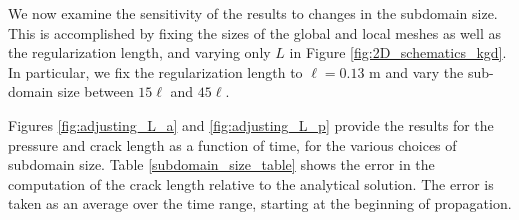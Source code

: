 We now examine the sensitivity of the results to changes in the subdomain size.  This is accomplished by fixing the sizes of the global and local meshes as well as the regularization length, and varying only $L$ in Figure \ref{fig:2D_schematics_kgd}. In particular, we fix the regularization length to $\ell = 0.13\text{ m}$ and vary the sub-domain size between $15\ell$ and $45\ell$.  

Figures \ref{fig:adjusting_L_a} and \ref{fig:adjusting_L_p} provide the results for the pressure and crack length as a function of time, for the various choices of subdomain size. Table \ref{subdomain_size_table} shows the error in the computation of the crack length relative to the analytical solution.  The error is taken as an average over the time range, starting at the beginning of propagation.

